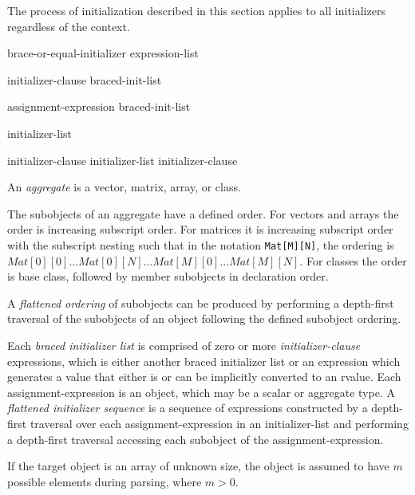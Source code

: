 
\p The process of initialization described in this section applies to all
initializers regardless of the context.

\begin{grammar}
  \br
  brace-or-equal-initializer\br
  \terminal{(} expression-list \terminal{)}\br

  \br
  \terminal{=} initializer-clause\br
  braced-init-list\br

  \br
  assignment-expression\br
  braced-init-list\br

  \br
  \terminal{\{} initializer-list \opt{\terminal{,}} \terminal{\}}\br
  \terminal{\{} \terminal{\}}\br

  \br
  initializer-clause\br
  initializer-list \terminal{,} initializer-clause\br
\end{grammar}


\p An \textit{aggregate} is a vector, matrix, array, or class.

\p The subobjects of an aggregate have a defined order. For vectors and arrays
the order is increasing subscript order. For matrices it is increasing subscript
order with the subscript nesting such that in the notation
\texttt{Mat[M][N]}, the ordering is \(Mat[0][0]...Mat[0][N]...
Mat[M][0]...Mat[M][N]\). For classes the order is base class, followed by member
subobjects in declaration order.

\p A \textit{flattened ordering} of subobjects can be produced by performing a
depth-first traversal of the subobjects of an object following the defined
subobject ordering.

\p Each \textit{braced initializer list} is comprised of zero or more
\textit{initializer-clause} expressions, which is either another braced
initializer list or an expression which generates a value that either is or can
be implicitly converted to an rvalue. Each assignment-expression is an object,
which may be a scalar or aggregate type. A \textit{flattened initializer
sequence} is a sequence of expressions constructed by a depth-first traversal
over each assignment-expression in an initializer-list and performing a
depth-first traversal accessing each subobject of the assignment-expression.

\p If the target object is an array of unknown size, the object is assumed to
have \(m\) possible elements during parsing, where \(m>0\).

